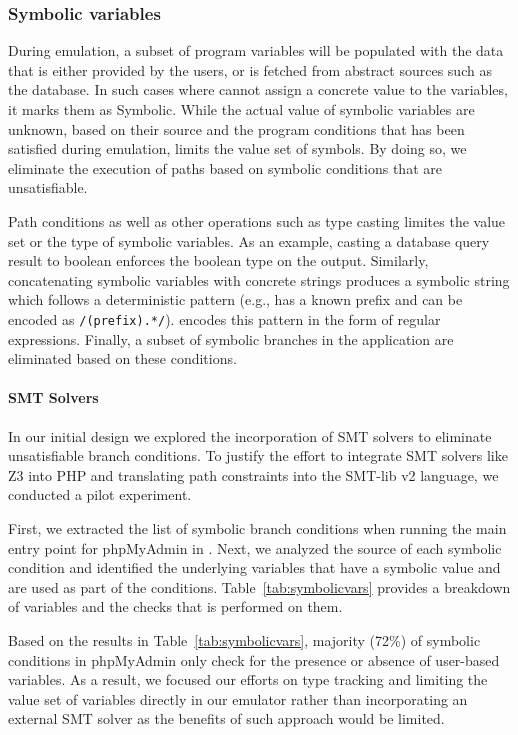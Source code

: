 \subsubsection{Symbolic variables}

During emulation, a subset of program variables will be populated with the data that is either provided by the users, or is fetched from abstract sources such as the database. 
In such cases where \animatedead{} cannot assign a concrete value to the variables, it marks them as Symbolic. 
While the actual value of symbolic variables are unknown, based on their source and the program conditions that has been satisfied during emulation, \animatedead{} limits the value set of symbols. 
By doing so, we eliminate the execution of paths based on symbolic conditions that are unsatisfiable.

Path conditions as well as other operations such as type casting limites the value set or the type of symbolic variables. 
As an example, casting a database query result to boolean enforces the boolean type on the output. 
Similarly, concatenating symbolic variables with concrete strings produces a symbolic string which follows a deterministic pattern (e.g., has a known prefix and can be encoded as \texttt{/(prefix).*/}). 
\animatedead{} encodes this pattern in the form of regular expressions. 
Finally, a subset of symbolic branches in the application are eliminated based on these conditions. 

\paragraph{SMT Solvers}
In our initial design we explored the incorporation of SMT solvers to eliminate unsatisfiable branch conditions. 
To justify the effort to integrate SMT solvers like Z3 into PHP and translating path constraints into the SMT-lib v2 language, we conducted a pilot experiment. 

First, we extracted the list of symbolic branch conditions when running the main entry point for phpMyAdmin in \animatedead{}. 
Next, we analyzed the source of each symbolic condition and identified the underlying variables that have a symbolic value and are used as part of the conditions. 
Table~\ref{tab:symbolicvars} provides a breakdown of variables and the checks that is performed on them. 

Based on the results in Table~\ref{tab:symbolicvars}, majority (72\%) of symbolic conditions in phpMyAdmin only check for the presence or absence of user-based variables. 
As a result, we focused our efforts on type tracking and limiting the value set of variables directly in our emulator rather than incorporating an external SMT solver as the benefits of such approach would be limited. 


